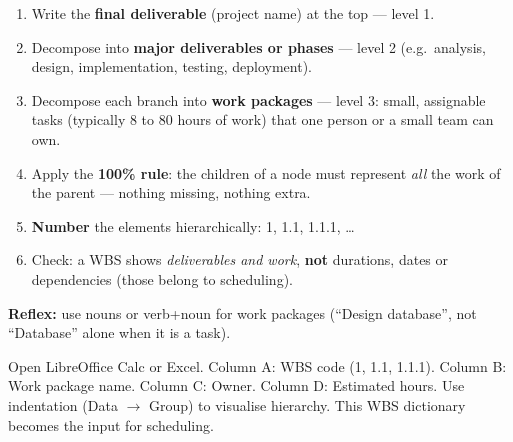 \documentclass[11pt]{article}
\begin{document}
\begin{methode}
\begin{enumerate}
\item Write the \textbf{final deliverable} (project name) at the top — level 1.
\item Decompose into \textbf{major deliverables or phases} — level 2 (e.g.\ analysis, design, implementation, testing, deployment).
\item Decompose each branch into \textbf{work packages} — level 3: small, assignable tasks (typically 8 to 80 hours of work) that one person or a small team can own.
\item Apply the \textbf{100\% rule}: the children of a node must represent \emph{all} the work of the parent — nothing missing, nothing extra.
\item \textbf{Number} the elements hierarchically: 1, 1.1, 1.1.1, \dots
\item Check: a WBS shows \emph{deliverables and work}, \textbf{not} durations, dates or dependencies (those belong to scheduling).
\end{enumerate}
\textbf{Reflex:} use nouns or verb+noun for work packages (``Design database'', not ``Database'' alone when it is a task).
\end{methode}

\begin{experience}
Open LibreOffice Calc or Excel. Column A: WBS code (1, 1.1, 1.1.1). Column B: Work package name. Column C: Owner. Column D: Estimated hours. Use indentation (Data $\to$ Group) to visualise hierarchy. This WBS dictionary becomes the input for scheduling.
\end{experience}
\end{document}

